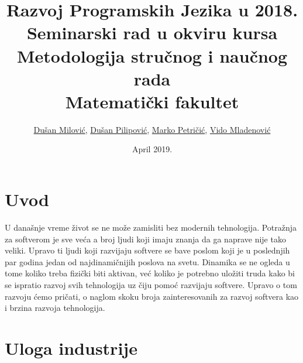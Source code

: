 \documentclass[a4paper]{article}
\begin{document}
\title{Razvoj Programskih Jezika u 2018.\\ \small{Seminarski rad u okviru kursa\\Metodologija stručnog i naučnog rada\\ Matematički fakultet}}

\author{ \href{mailto:dusan95kv@gmail.com}{Dušan Milović}, \href{mailto:dusanpilipovic95@gmail.com}{Dušan Pilipović}, \href{mailto:petricicmarko1995@gmail.com}{Marko Petričić}, \href{mailto:vido995@gmail.com}{Vido Mladenović}}

\date{April 2019.}

\maketitle


\tableofcontents

\newpage

\section{Uvod}
\label{sec:uvod}

U današnje vreme život se ne može zamisliti bez modernih tehnologija. Potražnja za softverom je sve veća a broj ljudi koji imaju znanja da ga naprave nije tako veliki. Upravo ti ljudi koji razvijaju softvere se bave poslom koji je u poslednjih par godina jedan od najdinamičnijih poslova na svetu. Dinamika se ne ogleda u tome koliko treba fizički biti aktivan, već koliko je potrebno uložiti truda kako bi se ispratio razvoj svih tehnologija uz čiju pomoć razvijaju softvere. Upravo o tom razvoju ćemo pričati, o naglom skoku broja zainteresovanih za razvoj softvera kao i brzina razvoja tehnologija.

\section{Uloga industrije}
\label{sec:uloga industrije}
\end{document}
